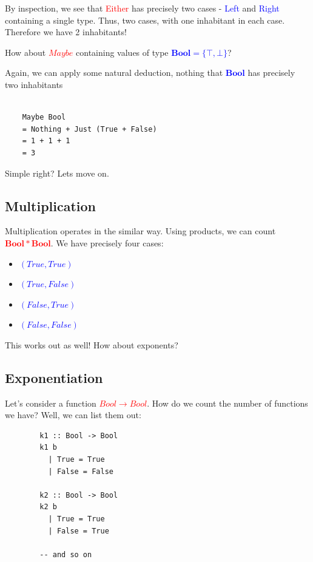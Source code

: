 \documentclass[tikz]{beamer}
\newcommand{\red}[1]{\textcolor{red}{#1}}
\newcommand{\mred}[1]{\textcolor{red}{$#1$}}
\newcommand{\blue}[1]{\textcolor{blue}{#1}}
\newcommand{\mblue}[1]{\textcolor{blue}{$#1$}}
\theoremstyle{definition}
\begin{document}
\frame
{ 
	By inspection, we see that \red{Either} has precisely two cases - \blue{Left} and \blue{Right} containing a single type. Thus, two cases, with one inhabitant in each case. Therefore we have 2 inhabitants!
}

\frame
{ 
	How about \mred{Maybe} containing values of type \mblue{\bm{Bool} = \{ \top, \bot\}}? 
}

\begin{frame}[fragile]

Again, we can apply some natural deduction, nothing that \mblue{\bm{Bool}} has precisely two inhabitants
	\begin{verbatim}
	
	Maybe Bool
	= Nothing + Just (True + False)
	= 1 + 1 + 1
	= 3
	\end{verbatim}
\end{frame}

\frame
{
	Simple right? Lets move on.
}

\subsection{Multiplication}

\frame
{

	Multiplication operates in the similar way. Using products, we can count \mred{\bm{Bool} * \bm{Bool}}. We have precisely four cases: 
	
	\begin{itemize}	
		\item \mblue{(True, True)}
		\item \mblue{(True, False)}
		\item \mblue{(False, True)}
		\item \mblue{(False, False)} 
	\end{itemize}
}

\frame
{
	This works out as well! How about exponents?
}

\subsection{Exponentiation}

\begin{frame}[fragile]
	Let's consider a function \mred{Bool \to Bool}. How do we count the number of functions we have? Well, we can list them out: 
	
	\begin{verbatim}
		k1 :: Bool -> Bool
		k1 b 
		  | True = True
		  | False = False 
		
		k2 :: Bool -> Bool 
		k2 b 
		  | True = True
		  | False = True 
		  		
		-- and so on	
	\end{verbatim}
	
\end{frame}
\end{document}
